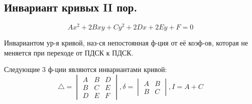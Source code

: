 \subsection{Инвариант кривых II пор.}
\begin{equation*}
Ax^{2} + 2Bxy + Cy^{2} + 2Dx + 2Ey + F = 0
\end{equation*}
\begin{definition}
Инвариантом ур-я кривой, наз-ся непостоянная ф-ция от её коэф-ов, которая не меняется при переходе от ПДСК к ПДСК.
\end{definition}
\begin{theorem}
Следующие 3 ф-ции являются инвариантами кривой: 
\[
  \triangle = \begin{vmatrix}A & B & D \\ B & C & E \\ D & E & F \end{vmatrix}, \delta = \begin{vmatrix}A & B \\ B & C \end{vmatrix}, I = A + C
\]
\end{theorem}
